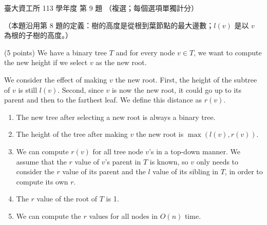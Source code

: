 \begin{pastexam}[label={px:ntu-113-dsa-09}]{臺大資工所 113 學年度 第 9 題}
（複選；每個選項單獨計分）

（本題沿用第 8 題的定義：樹的高度是從根到葉節點的最大邊數；$l(v)$ 是以 $v$ 為根的子樹的高度。）

(5 points) We have a binary tree $T$ and for every node $v\in T$, we want to compute the new height
if we select $v$ as the new root.

We consider the effect of making $v$ the new root. First, the height of the subtree of $v$ is still
$l(v)$. Second, since $v$ is now the new root, it could go up to its parent and then to the farthest
leaf. We define this distance as $r(v)$.
\begin{enumerate}[label=\Alph*.]
\item The new tree after selecting a new root is always a binary tree.
\item The height of the tree after making $v$ the new root is $\max(l(v),r(v))$.
\item We can compute $r(v)$ for all tree node $v$'s in a top-down manner. We assume that the $r$
value of $v$'s parent in $T$ is known, so $v$ only needs to consider the $r$ value of its parent and
the $l$ value of its sibling in $T$, in order to compute its own $r$.
\item The $r$ value of the root of $T$ is 1.
\item We can compute the $r$ values for all nodes in $O(n)$ time.
\end{enumerate}
\end{pastexam}

